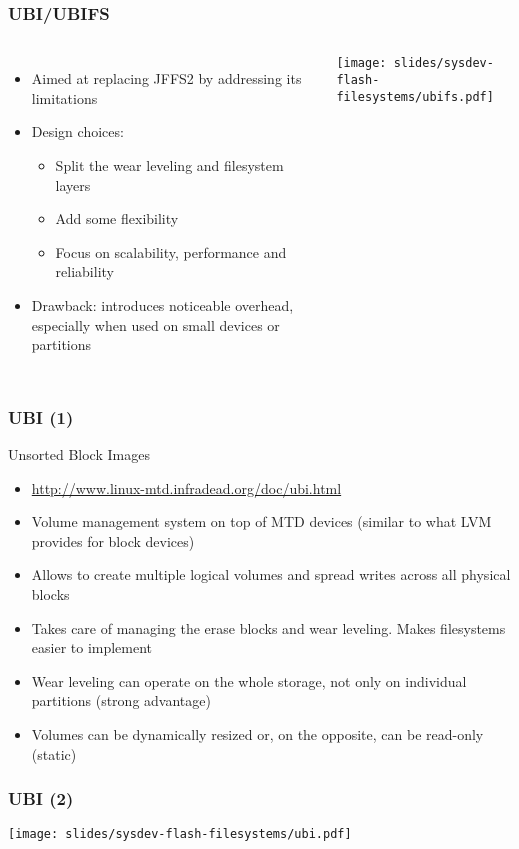 \begin{frame}
  \frametitle{UBI/UBIFS}
  \begin{columns}
    \begin{itemize}
    \item Aimed at replacing JFFS2 by addressing its limitations
    \item Design choices:
      \begin{itemize}
      \item Split the wear leveling and filesystem layers
      \item Add some flexibility
      \item Focus on scalability, performance and reliability
      \end{itemize}
    \item Drawback: introduces noticeable overhead, especially when
      used on small devices or partitions
    \end{itemize}
    \texttt{[image: slides/sysdev-flash-filesystems/ubifs.pdf]}
  \end{columns}
\end{frame}

\begin{frame}
  \frametitle{UBI (1)}
  Unsorted Block Images
  \begin{itemize}
  \item \url{http://www.linux-mtd.infradead.org/doc/ubi.html}
  \item Volume management system on top of MTD devices (similar to
    what LVM provides for block devices)
  \item Allows to create multiple logical volumes and spread writes
    across all physical blocks
  \item Takes care of managing the erase blocks and wear
    leveling. Makes filesystems easier to implement
  \item Wear leveling can operate on the whole storage,
    not only on individual partitions (strong advantage)
  \item Volumes can be dynamically resized or, on the opposite, can be
    read-only (static)
  \end{itemize}
\end{frame}

\begin{frame}
  \frametitle{UBI (2)}
  \begin{center}
    \texttt{[image: slides/sysdev-flash-filesystems/ubi.pdf]}
  \end{center}
\end{frame}

